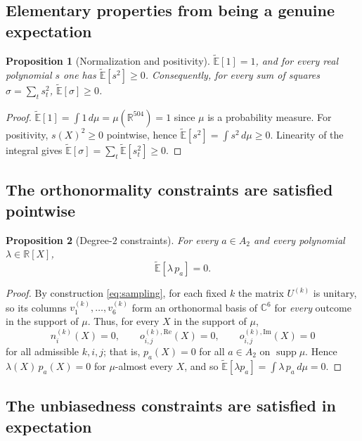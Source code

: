 \documentclass{amsart}
\newtheorem{proposition}{Proposition}
\theoremstyle{definition}
\begin{document}
\subsection{Elementary properties from being a genuine expectation}

\begin{proposition}[Normalization and positivity]\label{prop:posnorm}
$\widetilde{\mathbb{E}}[1]=1$, and for every real polynomial $s$ one has
$\widetilde{\mathbb{E}}[s^2]\ge 0$. Consequently, for every sum of squares
$\sigma=\sum_t s_t^2$, $\widetilde{\mathbb{E}}[\sigma]\ge 0$.
\end{proposition}

\begin{proof}
$\widetilde{\mathbb{E}}[1]=\int 1\,d\mu=\mu(\mathbb{R}^{504})=1$ since $\mu$ is a probability
measure. For positivity, $s(X)^2\ge0$ pointwise, hence
$\widetilde{\mathbb{E}}[s^2]=\int s^2\,d\mu\ge0$. Linearity of the integral gives
$\widetilde{\mathbb{E}}[\sigma]=\sum_t\widetilde{\mathbb{E}}[s_t^2]\ge0$. \qedhere
\end{proof}

\subsection{The orthonormality constraints are satisfied pointwise}

\begin{proposition}[Degree-$2$ constraints]\label{prop:deg2}
For every $a\in A_2$ and every polynomial $\lambda\in\mathbb{R}[X]$,
\[
\widetilde{\mathbb{E}}[\lambda\,p_a]=0 .
\]
\end{proposition}

\begin{proof}
By construction \eqref{eq:sampling}, for each fixed $k$ the matrix $U^{(k)}$ is unitary, so its
columns $v^{(k)}_1,\dots,v^{(k)}_6$ form an orthonormal basis of $\mathbb{C}^6$ for
\emph{every} outcome in the support of $\mu$. Thus, for every $X$ in the support of $\mu$,
\[
n^{(k)}_i(X)=0,\qquad o^{(k),\mathrm{Re}}_{i,j}(X)=0,\qquad o^{(k),\mathrm{Im}}_{i,j}(X)=0
\]
for all admissible $k,i,j$; that is, $p_a(X)=0$ for all $a\in A_2$ on $\operatorname{supp}\mu$.
Hence $\lambda(X)\,p_a(X)=0$ for $\mu$-almost every $X$, and so
$\widetilde{\mathbb{E}}[\lambda p_a]=\int \lambda\,p_a\,d\mu=0$. \qedhere
\end{proof}

\subsection{The unbiasedness constraints are satisfied in expectation}
\end{document}
